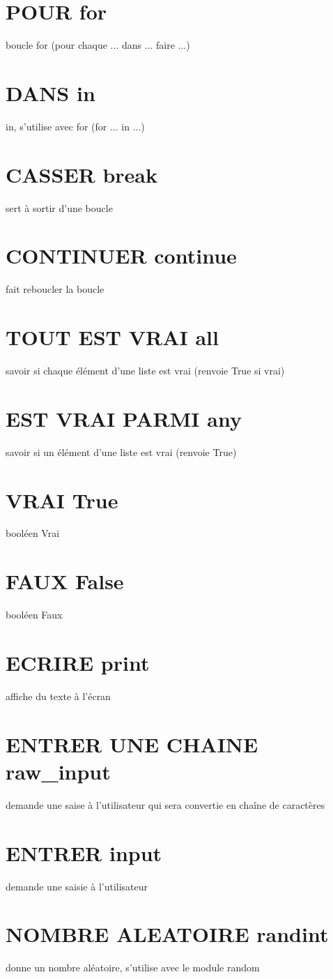 \documentclass{book}
\begin{document}
\section{POUR for }
  boucle for (pour chaque ... dans ... faire ...) 
\section{DANS in }
  in, s'utilise avec for (for ... in ...)
\section{CASSER break }
  sert à sortir d'une boucle
\section{CONTINUER continue }
  fait reboucler la boucle
\section{TOUT EST VRAI all }
  savoir si chaque élément d'une liste est vrai (renvoie True si vrai) 
\section{EST VRAI PARMI any }
  savoir si un élément d'une liste est vrai (renvoie True)
\section{VRAI True }
  booléen Vrai
\section{FAUX False }
  booléen Faux
\section{ECRIRE print }
  affiche du texte à l'écran
\section{ENTRER UNE CHAINE raw\_input }
  demande une saise à l'utilisateur qui sera convertie en chaîne de caractères
\section{ENTRER input }
  demande une saisie à l'utilisateur
\section{NOMBRE ALEATOIRE randint }
  donne un nombre aléatoire, s'utilise avec le module random
\end{document}

